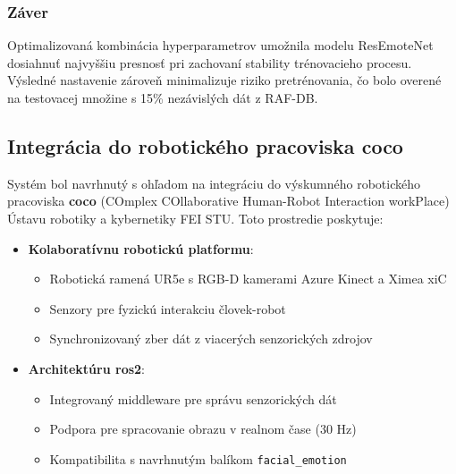 \subsubsection{Záver}

Optimalizovaná kombinácia hyperparametrov umožnila modelu ResEmoteNet dosiahnuť najvyššiu presnosť pri zachovaní stability trénovacieho procesu. Výsledné nastavenie zároveň minimalizuje riziko pretrénovania, čo bolo overené na testovacej množine s 15\% nezávislých dát z RAF-DB.

\subsection{Integrácia do robotického pracoviska \gls{coco}}
Systém bol navrhnutý s ohľadom na integráciu do výskumného robotického pracoviska \textbf{\gls{coco}} (COmplex COllaborative Human-Robot Interaction workPlace) Ústavu robotiky a kybernetiky FEI STU. Toto prostredie poskytuje:

\begin{itemize}
\item \textbf{Kolaboratívnu robotickú platformu}: 
\begin{itemize}
\item Robotická ramená UR5e s RGB-D kamerami Azure Kinect a Ximea xiC
\item Senzory pre fyzickú interakciu človek-robot 
\item Synchronizovaný zber dát z viacerých senzorických zdrojov
\end{itemize}

\item \textbf{Architektúru \gls{ros}2}: 
\begin{itemize}
\item Integrovaný middleware pre správu senzorických dát
\item Podpora pre spracovanie obrazu v realnom čase (30 Hz)
\item Kompatibilita s navrhnutým balíkom \texttt{facial\_emotion}
\end{itemize}
\end{itemize}

